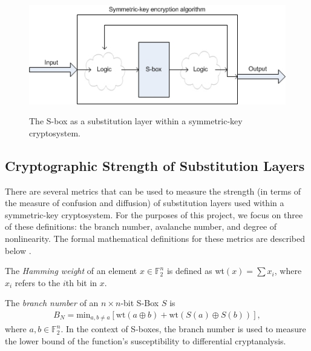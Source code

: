 \documentclass[11pt]{article}
\newcommand{\field}[1]{\mathbb{#1}} %
\begin{document}
\begin{figure}[!ht]
\centering
	\includegraphics[scale=0.75]{images/sub_layer.jpg} 
	\label{sublayer}
	\caption{The S-box as a substitution layer within a symmetric-key cryptosystem.}
\end{figure}

\subsection{Cryptographic Strength of Substitution Layers}
\label{strength}

There are several metrics that can be used to measure the strength (in terms of the measure of confusion and diffusion) of substitution layers used within a symmetric-key cryptosystem. For the purposes of this project, we focus on three of these definitions: the branch number, avalanche number, and degree of nonlinearity. The formal mathematical definitions for these metrics are described below \cite{Mar_newanalysis}.

\begin{define}
The \emph{Hamming weight} of an element $x \in \field{F}_2^n$ is defined as wt$(x) = \sum x_i$, where $x_i$ refers to the $i$th bit in $x$.
\end{define}

\begin{define}
The \emph{branch number} of an $n \times n$-bit S-Box $S$ is
\begin{eqnarray}
B_N = \text{min}_{a, b\not=a}\left[\text{wt}(a \oplus b) + \text{wt}(S(a) \oplus S(b))\right],
\end{eqnarray}
where $a, b \in \field{F}_2^n$. In the context of S-boxes, the branch number is used to measure the lower bound of the function's susceptibility to differential cryptanalysis.
\end{define}
\end{document}
